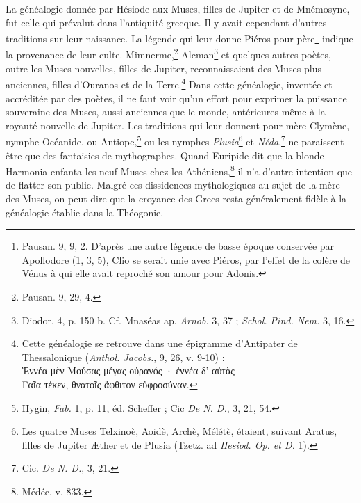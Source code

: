 \documentclass[a4paper, 11pt, oneside, polutonikogreek, french]{article}
\begin{document}
La généalogie donnée par Hésiode aux Muses, filles de Jupiter et de Mnémosyne, fut celle qui prévalut dans l'antiquité grecque. Il y avait cependant d'autres traditions sur leur naissance. La légende qui leur donne Piéros pour père\footnote{Pausan. 9, 9, 2. D'après une autre légende de basse époque conservée par Apollodore (1, 3, 5), Clio se serait unie avec Piéros, par l'effet de la colère de Vénus à qui elle avait reproché son amour pour Adonis.} indique la provenance de leur culte. Mimnerme,\footnote{Pausan. 9, 29, 4.} Alcman\footnote{Diodor. 4, p. 150 b. Cf. Mnaséas ap. \emph{Arnob.} 3, 37 ; \emph{Schol. Pind. Nem.} 3, 16.} et quelques autres poètes, outre les Muses nouvelles, filles de Jupiter, reconnaissaient des Muses plus anciennes, filles d'Ouranos et de la Terre.\footnote{Cette généalogie se retrouve dans une épigramme d'Antipater de Thessalonique (\emph{Anthol. Jacobs.}, 9, 26, v. 9-10) :\\\hspace*{5mm}Ἐννέα μὲν Μούσας μέγας οὐρανός · ἐννέα δ' αὐτὰς\\\hspace*{5mm}Γαῖα τέκεν, θνατοῖς ἄφθιτον εὐφροσύναν.} Dans cette généalogie, inventée et accréditée par des poètes, il ne faut voir qu'un effort pour exprimer la puissance souveraine des Muses, aussi anciennes que le monde, antérieures même à la royauté nouvelle de Jupiter. Les traditions qui leur donnent pour mère Clymène, nymphe Océanide, ou Antiope,\footnote{Hygin, \emph{Fab.} 1, p. 11, éd. Scheffer ; Cic \emph{De N. D.}, 3, 21, 54.} ou les nymphes \emph{Plusia}\footnote{Les quatre Muses Telxinoè, Aoidè, Archè, Mélétè, étaient, suivant Aratus, filles de Jupiter Æther et de Plusia (Tzetz. ad \emph{Hesiod. Op. et D.} 1).} et \emph{Néda},\footnote{Cic. \emph{De N. D.}, 3, 21.} ne paraissent être que des fantaisies de mythographes. Quand Euripide dit que la blonde Harmonia enfanta les neuf Muses chez les Athéniens,\footnote{Médée, v. 833.} il n'a d'autre intention que de flatter son public. Malgré ces dissidences mythologiques au sujet de la mère des Muses, on peut dire que la croyance des Grecs resta généralement fidèle à la généalogie établie dans la Théogonie.
\end{document}
